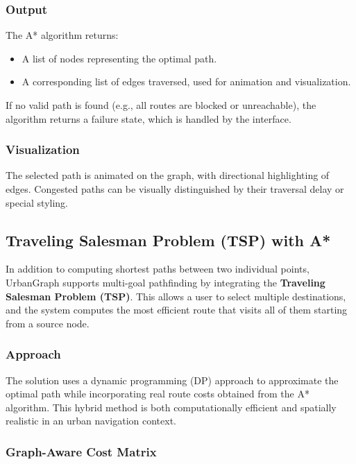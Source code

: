 \documentclass[12pt]{article}
\begin{document}
\subsubsection*{Output}

The A* algorithm returns:
\begin{itemize}
    \item A list of nodes representing the optimal path.
    \item A corresponding list of edges traversed, used for animation and visualization.
\end{itemize}

If no valid path is found (e.g., all routes are blocked or unreachable), the algorithm returns a failure state, which is handled by the interface.

\subsubsection*{Visualization}

The selected path is animated on the graph, with directional highlighting of edges. Congested paths can be visually distinguished by their traversal delay or special styling.

\subsection{Traveling Salesman Problem (TSP) with A*}

In addition to computing shortest paths between two individual points, UrbanGraph supports multi-goal pathfinding by integrating the \textbf{Traveling Salesman Problem (TSP)}. This allows a user to select multiple destinations, and the system computes the most efficient route that visits all of them starting from a source node.

\subsubsection*{Approach}

The solution uses a dynamic programming (DP) approach to approximate the optimal path while incorporating real route costs obtained from the A* algorithm. This hybrid method is both computationally efficient and spatially realistic in an urban navigation context.

\subsubsection*{Graph-Aware Cost Matrix}
\end{document}
